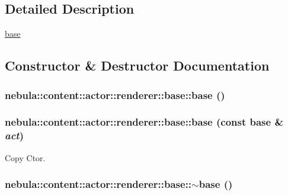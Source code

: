 \subsection{Detailed Description}
\hyperlink{classnebula_1_1content_1_1actor_1_1renderer_1_1base}{base} 

\subsection{Constructor \& Destructor Documentation}
\hypertarget{classnebula_1_1content_1_1actor_1_1renderer_1_1base_a6d2371ae7900aae03442b5f592c44f34}{
\subsubsection[{base}]{\setlength{\rightskip}{0pt plus 5cm}nebula::content::actor::renderer::base::base ()}}
\label{classnebula_1_1content_1_1actor_1_1renderer_1_1base_a6d2371ae7900aae03442b5f592c44f34}
\hypertarget{classnebula_1_1content_1_1actor_1_1renderer_1_1base_aaa23f00832374d2d2c81b524dafb65da}{
\subsubsection[{base}]{\setlength{\rightskip}{0pt plus 5cm}nebula::content::actor::renderer::base::base (const {\bf base} \& {\em act})}}
\label{classnebula_1_1content_1_1actor_1_1renderer_1_1base_aaa23f00832374d2d2c81b524dafb65da}


Copy Ctor. \hypertarget{classnebula_1_1content_1_1actor_1_1renderer_1_1base_a1d7ed21b51ac49eb5996355c1d4d095d}{
\subsubsection[{$\sim$base}]{\setlength{\rightskip}{0pt plus 5cm}nebula::content::actor::renderer::base::$\sim$base ()}}
\label{classnebula_1_1content_1_1actor_1_1renderer_1_1base_a1d7ed21b51ac49eb5996355c1d4d095d}


